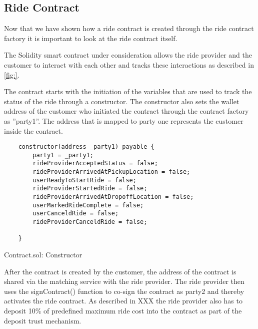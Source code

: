 \subsection{Ride Contract}
Now that we have shown how a ride contract is created through the ride contract factory it is important to look at the ride contract itself.

The Solidity smart contract under consideration allows the ride provider and the customer to interact with each other and tracks these interactions as described in \ref{fig:}.

The contract starts with the initiation of the variables that are used to track the status of the ride through a constructor. The constructor also sets the wallet address of the customer who initiated the contract through the contract factory as ''party1''. The address that is mapped to party one represents the customer inside the contract.

\lstset{
  basicstyle=\footnotesize\ttfamily,
  breaklines=true,
  numbers=left,
  firstnumber=30
}

\begin{Listing}
\begin{lstlisting}
    constructor(address _party1) payable {
        party1 = _party1;
        rideProviderAcceptedStatus = false;
        rideProviderArrivedAtPickupLocation = false;
        userReadyToStartRide = false;
        rideProviderStartedRide = false;
        rideProviderArrivedAtDropoffLocation = false;
        userMarkedRideComplete = false;
        userCanceldRide = false;
        rideProviderCanceldRide = false;

    }
\end{lstlisting}
  \caption{Contract.sol: Constructor}
  \label{lst:constructor}
\end{Listing}

After the contract is created by the customer, the address of the contract is shared via the matching service with the ride provider. The ride provider then uses the signContract() function to co-sign the contract as party2 and thereby activates the ride contract. As described in XXX the ride provider also has to deposit 10\% of predefined  maximum ride cost into the contract as part of the deposit trust mechanism.

\lstset{
  basicstyle=\footnotesize\ttfamily,
  breaklines=true,
  numbers=left,
  firstnumber=76
}

